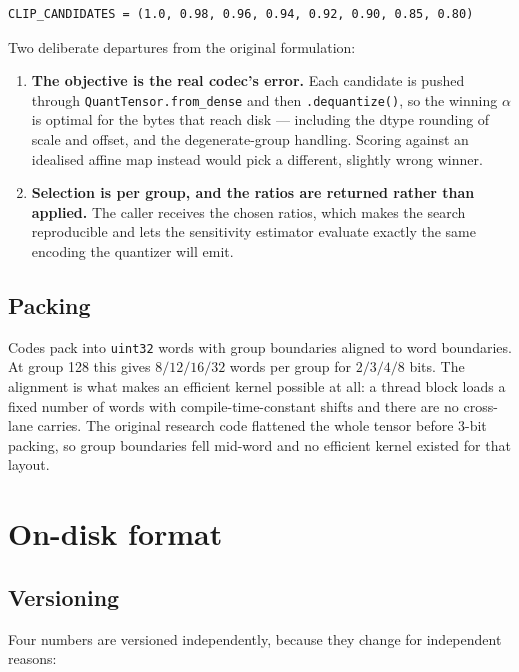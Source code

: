 \documentclass[11pt]{article}
\newcommand{\code}[1]{\texttt{#1}}
\begin{document}
\begin{verbatim}
CLIP_CANDIDATES = (1.0, 0.98, 0.96, 0.94, 0.92, 0.90, 0.85, 0.80)
\end{verbatim}

Two deliberate departures from the original formulation:

\begin{enumerate}
\item \textbf{The objective is the real codec's error.} Each candidate is pushed through
\code{QuantTensor.from\_dense} and then \code{.dequantize()}, so the winning $\alpha$ is optimal
for the bytes that reach disk --- including the dtype rounding of scale and offset, and the
degenerate-group handling. Scoring against an idealised affine map instead would pick a
different, slightly wrong winner.
\item \textbf{Selection is per group, and the ratios are returned rather than applied.} The
caller receives the chosen ratios, which makes the search reproducible and lets the sensitivity
estimator evaluate exactly the same encoding the quantizer will emit.
\end{enumerate}

\subsection{Packing}

Codes pack into \code{uint32} words with group boundaries aligned to word boundaries. At group
128 this gives $8 / 12 / 16 / 32$ words per group for $2 / 3 / 4 / 8$ bits. The alignment is what
makes an efficient kernel possible at all: a thread block loads a fixed number of words with
compile-time-constant shifts and there are no cross-lane carries. The original research code
flattened the whole tensor before 3-bit packing, so group boundaries fell mid-word and no
efficient kernel existed for that layout.

\section{On-disk format}
\label{sec:format}

\subsection{Versioning}

Four numbers are versioned independently, because they change for independent reasons:
\end{document}
